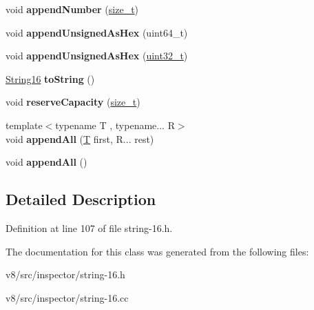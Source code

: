 \begin{DoxyCompactItemize}
void {\bfseries append\+Number} (\mbox{\hyperlink{classsize__t}{size\+\_\+t}})
\item 
\mbox{\label{classv8__inspector_1_1String16Builder_aeaef769fd2d93cf2ea0d5a2cc54489ac}} 
void {\bfseries append\+Unsigned\+As\+Hex} (uint64\+\_\+t)
\item 
\mbox{\label{classv8__inspector_1_1String16Builder_aa306f4081214163c41a8a740dc0bf94c}} 
void {\bfseries append\+Unsigned\+As\+Hex} (\mbox{\hyperlink{classuint32__t}{uint32\+\_\+t}})
\item 
\mbox{\label{classv8__inspector_1_1String16Builder_a37f172602b3477d91e4c9af9324b1d13}} 
\mbox{\hyperlink{classv8__inspector_1_1String16}{String16}} {\bfseries to\+String} ()
\item 
\mbox{\label{classv8__inspector_1_1String16Builder_ac3def8d68c3012580b5f9d214df57854}} 
void {\bfseries reserve\+Capacity} (\mbox{\hyperlink{classsize__t}{size\+\_\+t}})
\item 
\mbox{\label{classv8__inspector_1_1String16Builder_a4ceb1acdfdc036a081a2a66ff39dede4}} 
{\footnotesize template$<$typename T , typename... R$>$ }\\void {\bfseries append\+All} (\mbox{\hyperlink{classv8_1_1internal_1_1torque_1_1T}{T}} first, R... rest)
\item 
\mbox{\label{classv8__inspector_1_1String16Builder_a75f5d59c0c9b6e6aa5131449de7bfa1b}} 
void {\bfseries append\+All} ()
\end{DoxyCompactItemize}


\subsection{Detailed Description}


Definition at line 107 of file string-\/16.\+h.



The documentation for this class was generated from the following files\+:\begin{DoxyCompactItemize}
\item 
v8/src/inspector/string-\/16.\+h\item 
v8/src/inspector/string-\/16.\+cc\end{DoxyCompactItemize}

